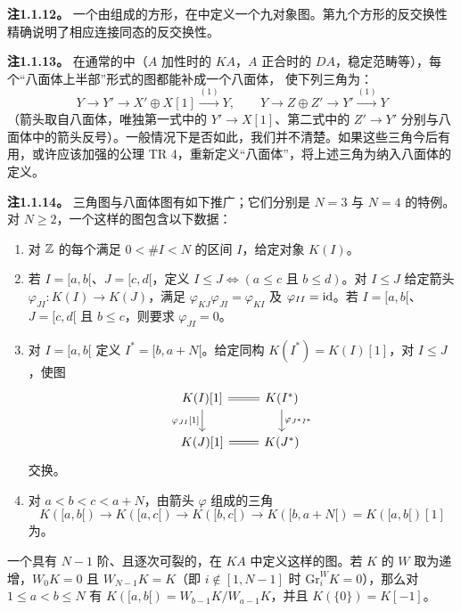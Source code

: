 \par\medskip\noindent\textbf{注1.1.12。} 一个由组成的方形，在中定义一个九对象图。第九个方形的反交换性精确说明了相应连接同态的反交换性。

\par\medskip\noindent\textbf{注1.1.13。} 在通常的中（$A$ 加性时的 $KA$，$A$ 正合时的 $DA$，稳定范畴等），每个“八面体上半部”形式的图都能补成一个八面体，
使下列三角为：
\[
 Y\longrightarrow Y'\longrightarrow X'\oplus X[1]\xrightarrow{(1)}Y,
 \qquad
 Y\longrightarrow Z\oplus Z'\longrightarrow Y'\xrightarrow{(1)}Y
\]
（箭头取自八面体，唯独第一式中的 $Y'\to X[1]$、第二式中的 $Z'\to Y'$ 分别与八面体中的箭头反号）。一般情况下是否如此，我们并不清楚。如果这些三角今后有用，或许应该加强的公理 TR 4，重新定义“八面体”，将上述三角为纳入八面体的定义。

\par\medskip\noindent\textbf{注1.1.14。} 三角图与八面体图有如下推广；它们分别是 $N=3$ 与 $N=4$ 的特例。对 $N\geq2$，一个这样的图包含以下数据：
\begin{enumerate}[label=(\alph*)]
\item 对 $\mathbb Z$ 的每个满足 $0<\#I<N$ 的区间 $I$，给定对象 $K(I)$。
\item 若 $I=[a,b[$、$J=[c,d[$，定义 $I\leq J\Longleftrightarrow(a\leq c\text{ 且 }b\leq d)$。对 $I\leq J$ 给定箭头 $\varphi_{JI}:K(I)\to K(J)$，满足 $\varphi_{KJ}\varphi_{JI}=\varphi_{KI}$ 及 $\varphi_{II}=\operatorname{id}$。若 $I=[a,b[$、$J=[c,d[$ 且 $b\leq c$，则要求 $\varphi_{JI}=0$。
\item 对 $I=[a,b[$ 定义 $I^*=[b,a+N[$。给定同构 $K(I^*)=K(I)[1]$，对 $I\leq J$，使图
\[
\begin{tikzcd}[ampersand replacement=\&]
 K(I)[1]\arrow[r,equal]\arrow[d,"{\varphi_{JI}[1]}"']\&K(I^*)\arrow[d,"{\varphi_{J^*I^*}}"]\\
 K(J)[1]\arrow[r,equal]\&K(J^*)
\end{tikzcd}
\]
交换。
\item 对 $a<b<c<a+N$，由箭头 $\varphi$ 组成的三角
\[
 K([a,b[)\longrightarrow K([a,c[)\longrightarrow K([b,c[)\longrightarrow K([b,a+N[)=K([a,b[)[1]
\]
为。
\end{enumerate}
一个具有 $N-1$ 阶、且逐次可裂的，在 $KA$ 中定义这样的图。若 $K$ 的 $W$ 取为递增，$W_0K=0$ 且 $W_{N-1}K=K$（即 $i\notin[1,N-1]$ 时 $\mathrm{Gr}^W_iK=0$），那么对 $1\leq a<b\leq N$ 有 $K([a,b[)=W_{b-1}K/W_{a-1}K$，并且 $K(\{0\})=K[-1]$。
